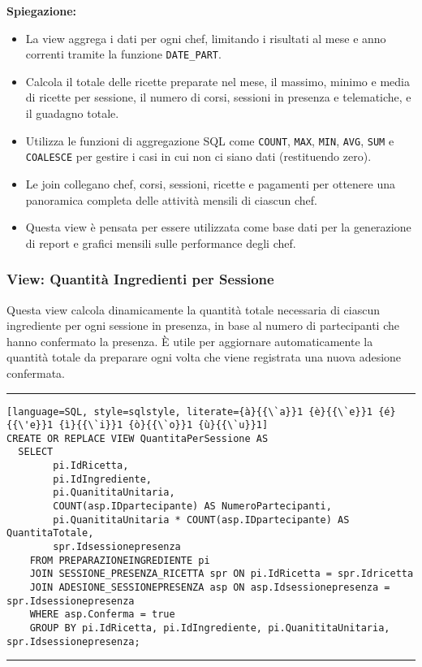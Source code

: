 \textbf{Spiegazione:}
\begin{itemize}
    \item La view aggrega i dati per ogni chef, limitando i risultati al mese e anno correnti tramite la funzione \texttt{DATE\_PART}.
    \item Calcola il totale delle ricette preparate nel mese, il massimo, minimo e media di ricette per sessione, il numero di corsi, sessioni in presenza e telematiche, e il guadagno totale.
    \item Utilizza le funzioni di aggregazione SQL come \texttt{COUNT}, \texttt{MAX}, \texttt{MIN}, \texttt{AVG}, \texttt{SUM} e \texttt{COALESCE} per gestire i casi in cui non ci siano dati (restituendo zero).
    \item Le join collegano chef, corsi, sessioni, ricette e pagamenti per ottenere una panoramica completa delle attività mensili di ciascun chef.
    \item Questa view è pensata per essere utilizzata come base dati per la generazione di report e grafici mensili sulle performance degli chef.
\end{itemize}

\subsubsection{View: Quantità Ingredienti per Sessione}

Questa view calcola dinamicamente la quantità totale necessaria di ciascun ingrediente per ogni sessione in presenza, in base al numero di partecipanti che hanno confermato la presenza. È utile per aggiornare automaticamente la quantità totale da preparare ogni volta che viene registrata una nuova adesione confermata.

\noindent\rule{\textwidth}{0.4pt}
\begin{lstlisting}[language=SQL, style=sqlstyle, literate={à}{{\`a}}1 {è}{{\`e}}1 {é}{{\'e}}1 {ì}{{\`i}}1 {ò}{{\`o}}1 {ù}{{\`u}}1]
CREATE OR REPLACE VIEW QuantitaPerSessione AS
  SELECT 
        pi.IdRicetta,
        pi.IdIngrediente,
        pi.QuanititaUnitaria,
        COUNT(asp.IDpartecipante) AS NumeroPartecipanti,
        pi.QuanititaUnitaria * COUNT(asp.IDpartecipante) AS QuantitaTotale,
        spr.Idsessionepresenza
    FROM PREPARAZIONEINGREDIENTE pi
    JOIN SESSIONE_PRESENZA_RICETTA spr ON pi.IdRicetta = spr.Idricetta
    JOIN ADESIONE_SESSIONEPRESENZA asp ON asp.Idsessionepresenza = spr.Idsessionepresenza
    WHERE asp.Conferma = true
    GROUP BY pi.IdRicetta, pi.IdIngrediente, pi.QuanititaUnitaria, spr.Idsessionepresenza;
\end{lstlisting}
\noindent\rule{\textwidth}{0.4pt}

